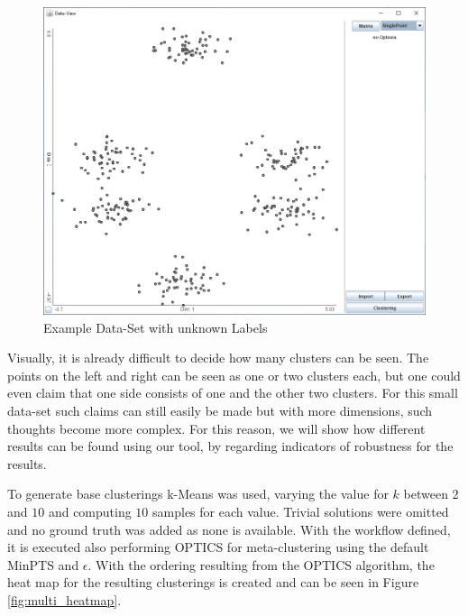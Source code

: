 \documentclass[
	a4paper,
	english,
	twoside,
	openright,               
	11pt                            
	]{report}
\begin{document}
\begin{figure}[h]
	\centering
	\includegraphics[scale=.5]{multi}
	\caption{Example Data-Set with unknown Labels}
	\label{fig:multi}
\end{figure}

Visually, it is already difficult to decide how many clusters can be seen. The points on the left and right can be seen as one or two clusters each, but one could even claim that one side consists of one and the other two clusters. For this small data-set such claims can still easily be made but with more dimensions, such thoughts become more complex. For this reason, we will show how different results can be found using our tool, by regarding indicators of robustness for the results.

To generate base clusterings k-Means was used, varying the value for $k$ between $2$ and $10$ and computing $10$ samples for each value. Trivial solutions were omitted and no ground truth was added as none is available. With the workflow defined, it is executed also performing OPTICS for meta-clustering using the default MinPTS and $\epsilon$. With the ordering resulting from the OPTICS algorithm, the heat map for the resulting clusterings is created and can be seen in Figure \ref{fig:multi_heatmap}.
\end{document}
